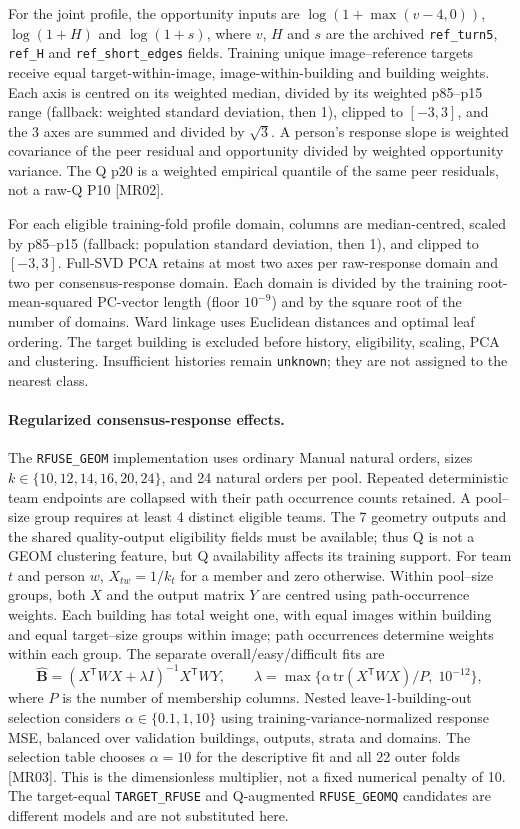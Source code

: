 For the joint profile, the opportunity inputs are
$\log(1+\max(v-4,0))$, $\log(1+H)$ and $\log(1+s)$, where
$v$, $H$ and $s$ are the archived \texttt{ref\_turn5}, \texttt{ref\_H} and
\texttt{ref\_short\_edges} fields.
Training unique image--reference targets receive equal
target-within-image, image-within-building and building weights.
Each axis is centred on its weighted median, divided by its weighted
p85--p15 range (fallback: weighted standard deviation, then 1), clipped to
$[-3,3]$, and the 3 axes are summed and divided by $\sqrt{3}$.
A person's response slope is weighted covariance of the peer residual and
opportunity divided by weighted opportunity variance. The Q p20 is a weighted
empirical quantile of the same peer residuals, not a raw-Q P10 [MR02].

For each eligible training-fold profile domain, columns are median-centred,
scaled by p85--p15 (fallback: population standard deviation, then 1), and
clipped to $[-3,3]$. Full-SVD PCA retains at most two axes per raw-response
domain and two per consensus-response domain. Each domain is divided by
the training root-mean-squared PC-vector length (floor $10^{-9}$) and by
the square root of the number of domains. Ward linkage uses Euclidean
distances and optimal leaf ordering. The target building is excluded before
history, eligibility, scaling, PCA and clustering. Insufficient histories
remain \texttt{unknown}; they are not assigned to the nearest class.

\paragraph{Regularized consensus-response effects.}
The \texttt{RFUSE\_GEOM} implementation uses ordinary Manual natural
orders, sizes $k\in\{10,12,14,16,20,24\}$, and 24 natural orders per pool.
Repeated deterministic team endpoints are collapsed with their path
occurrence counts retained. A pool--size group requires at least 4
distinct eligible teams. The 7 geometry outputs and the shared
quality-output eligibility fields must be available; thus Q is not a
GEOM clustering feature, but Q availability affects its training support.
For team $t$ and person $w$, $X_{tw}=1/k_t$ for a member and zero otherwise.
Within pool--size groups, both $X$ and the output matrix $Y$ are centred
using path-occurrence weights. Each building has total weight one, with
equal images within building and equal target--size groups within image;
path occurrences determine weights within each group. The separate
overall/easy/difficult fits are
\[
 \widehat{\mathbf B}
 = (X^\mathsf{T}WX+\lambda I)^{-1}X^\mathsf{T}WY,\qquad
 \lambda=\max\{ \alpha\,\mathrm{tr}(X^\mathsf{T}WX)/P,\;10^{-12}\},
\]
where $P$ is the number of membership columns.
Nested leave-1-building-out selection considers
$\alpha\in\{0.1,1,10\}$ using training-variance-normalized response MSE,
balanced over validation buildings, outputs, strata and domains.
The selection table chooses $\alpha=10$ for the descriptive fit
and all 22 outer folds [MR03]. This is the dimensionless multiplier, not
a fixed numerical penalty of 10. The target-equal
\texttt{TARGET\_RFUSE} and Q-augmented \texttt{RFUSE\_GEOMQ} candidates are
different models and are not substituted here.

